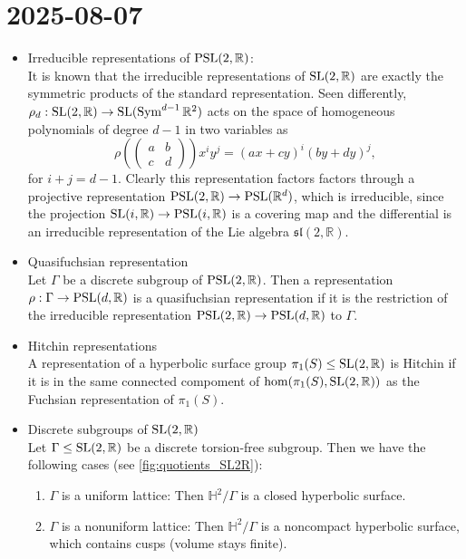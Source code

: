 \documentclass{report}
\begin{document}
\section{2025-08-07}
\begin{itemize}
    \item Irreducible representations of $\operatorname{{\mathrm{PSL}}}(2,\mathbb R)$:\\
    It is known that the irreducible representations of $\operatorname{{\mathrm{SL}}}(2,\mathbb R)$ are exactly the symmetric products of the standard representation.
    Seen differently, $\rho_d: \operatorname{{\mathrm{SL}}}(2,\mathbb R) \to \operatorname{{\mathrm{SL}}}(\operatorname{Sym}^{d-1}\mathbb R^2)$ acts on the space of homogeneous polynomials of degree $d-1$ in two variables as
    \[
    \rho\left(\begin{pmatrix}
        a & b \\
        c & d
    \end{pmatrix}\right) x^i y^j = (ax + cy)^i (by + dy)^j,
    \]
    for $i+j = d-1$.
    Clearly this representation factors factors through a projective representation $\operatorname{{\mathrm{PSL}}}(2,\mathbb R) \to \operatorname{{\mathrm{PSL}}}(\mathbb R^d)$, which is irreducible, since the projection $\operatorname{{\mathrm{SL}}}(i, \mathbb R) \to \operatorname{{\mathrm{PSL}}}(i, \mathbb R)$ is a covering map and the differential is an irreducible representation of the Lie algebra $\mathfrak{sl}(2,\mathbb R)$.
    \item Quasifuchsian representation\\
    Let $\Gamma$ be a discrete subgroup of $\operatorname{{\mathrm{PSL}}}(2,\mathbb R)$.
    Then a representation $\rho:\Gamma \to \operatorname{{\mathrm{PSL}}}(d,\mathbb R)$ is a quasifuchsian representation if it is the restriction of the irreducible representation $\operatorname{{\mathrm{PSL}}}(2,\mathbb R) \to \operatorname{{\mathrm{PSL}}}(d,\mathbb R)$ to $\Gamma$.
    \item Hitchin representations\\
    A representation of a hyperbolic surface group $\pi_1(S) \leq \operatorname{{\mathrm{SL}}}(2,\mathbb R)$ is Hitchin if it is in the same connected compoment of $\hom(\pi_1(S), \operatorname{{\mathrm{SL}}}(2,\mathbb R))$ as the Fuchsian representation of $\pi_1(S)$.
    \item Discrete subgroups of $\operatorname{{\mathrm{SL}}}(2,\mathbb R)$\\
    Let $\Gamma \leq \operatorname{{\mathrm{SL}}}(2,\mathbb R)$ be a discrete torsion-free subgroup.
    Then we have the following cases (see \cref{fig:quotients_SL2R}):
    \begin{enumerate}[label=(\roman*)]
        \item $\Gamma$ is a uniform lattice: Then $\mathbb H^2 / \Gamma$ is a closed hyperbolic surface.
        \item $\Gamma$ is a nonuniform lattice: Then $\mathbb H^2 / \Gamma$ is a noncompact hyperbolic surface, which contains cusps (volume stays finite).

\end{enumerate}
\end{itemize}
\end{document}
